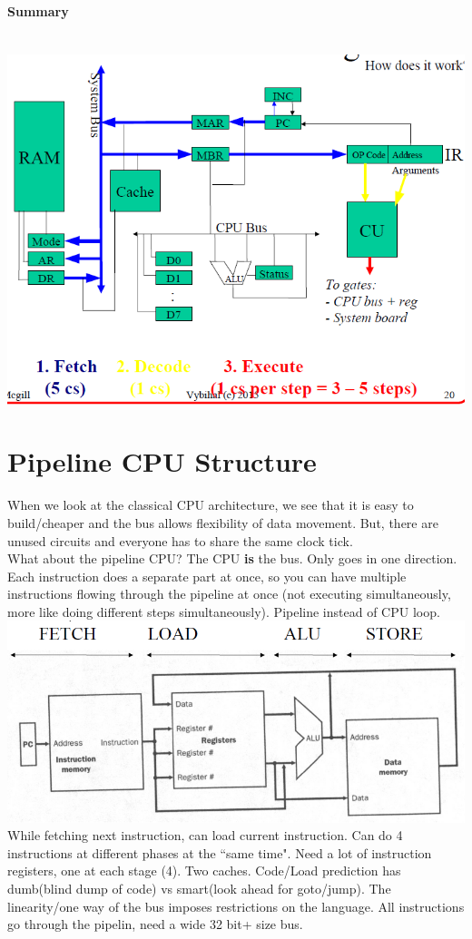 \documentclass[12 pt]{article}
\begin{document}
		\paragraph{Summary}
		~\\ \includegraphics[scale=0.7]{ccpe}
	\section{Pipeline CPU Structure}
	When we look at the classical CPU architecture, we see that it is easy to build/cheaper and the bus allows flexibility of data movement. But, there are unused circuits and everyone has to share the same clock tick.
	\\ What about the pipeline CPU? The CPU \textbf{is} the bus. Only goes in one direction. Each instruction does a separate part at once, so you can have multiple instructions flowing through the pipeline at once (not executing simultaneously, more like doing different steps simultaneously). Pipeline instead of CPU loop.\\ \includegraphics[scale=0.7]{ppl}
	While fetching next instruction, can load current instruction. Can do 4 instructions at different phases at the ``same time". Need a lot of instruction registers, one at each stage (4). Two caches. Code/Load prediction has dumb(blind dump of code) vs smart(look ahead for goto/jump). The linearity/one way of the bus imposes restrictions on the language. All instructions go through the pipelin, need a wide 32 bit+ size bus.
\end{document}
